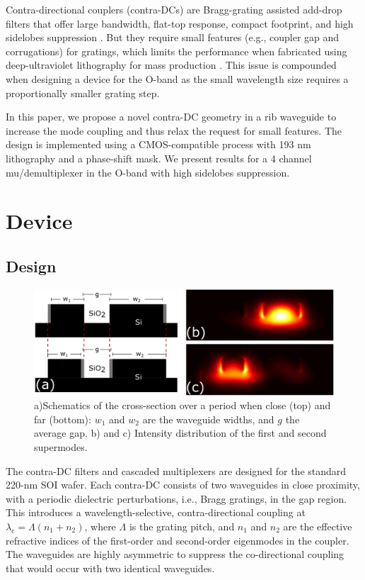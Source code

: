\documentclass[letterpaper,10pt]{article}
\begin{document}
	Contra-directional couplers (contra-DCs) are Bragg-grating assisted add-drop filters that offer large bandwidth, flat-top response, compact footprint, and high sidelobes suppression \cite{shi2013siliconContraDC}. But they require small features (e.g., coupler gap and corrugations) for gratings, which limits the performance when fabricated using deep-ultraviolet lithography for mass production \cite{shi2013siliconContraDC}\cite{shi2013coupler}. This issue is compounded when designing a device for the O-band as the small wavelength size requires a proportionally smaller grating step.
	
	In this paper, we propose a novel contra-DC geometry in a rib waveguide to increase the mode coupling and thus relax the request for small features. The design is implemented using a CMOS-compatible process with 193 nm lithography and a phase-shift mask.  We present results for a 4 channel mu/demultiplexer in the O-band with high sidelobes suppression.
	
	
	\section{Device}
	\subsection{Design} 
	\begin{figure}[htbp]
		\centering
		\includegraphics[width=.60\columnwidth]{CrossSection3}
		\caption{ a)Schematics of the cross-section over a period when close (top) and far (bottom): $w_1$ and $w_2$ are the waveguide widths, and $g$ the average gap. b) and c) Intensity distribution of the first and second supermodes. }
		\label{fig:Device}
	\end{figure}
	
	The contra-DC filters and cascaded multiplexers are designed for the standard 220-nm SOI wafer. Each contra-DC consists of two waveguides in close proximity, with a periodic dielectric perturbations, i.e., Bragg gratings, in the gap region. This introduces a wavelength-selective, contra-directional coupling at  $\lambda_\text{c} = \Lambda (n_\text{1}+n_\text{2})$, where $\Lambda$ is the grating pitch, and $n_\text{1}$ and $n_\text{2}$ are the effective refractive indices of the first-order and second-order eigenmodes in the coupler. 
	The waveguides are highly asymmetric to suppress the co-directional coupling that would occur with two identical waveguides.
	
\end{document}
